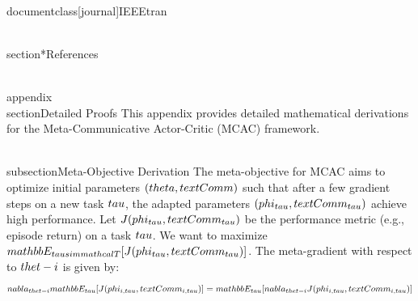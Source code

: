 \\documentclass[journal]{IEEEtran}
\begin{document}
\\section*{References}
\
\

\\appendix
\\section{Detailed Proofs}
This appendix provides detailed mathematical derivations for the Meta-Communicative Actor-Critic (MCAC) framework.

\\subsection{Meta-Objective Derivation}
The meta-objective for MCAC aims to optimize initial parameters $(\\theta, \\text{Comm})$ such that after a few gradient steps on a new task $\\tau$, the adapted parameters $(\\phi_{\\tau}, \\text{Comm}_{\\tau})$ achieve high performance.
Let $J(\\phi_{\\tau}, \\text{Comm}_{\\tau})$ be the performance metric (e.g., episode return) on a task $\\tau$. We want to maximize $\\mathbb{E}_{\\tau \\sim \\mathcal{T}}[J(\\phi_{\\tau}, \\text{Comm}_{\\tau})]$.
The meta-gradient with respect to $\\thet-i$ is given by:
$$ \\nabla_{\\thet-i} \\mathbb{E}_{\\tau}[J(\\phi_{i,\\tau}, \\text{Comm}_{i,\\tau})] = \\mathbb{E}_{\\tau}[\\nabla_{\\thet-i} J(\\phi_{i,\\tau}, \\text{Comm}_{i,\\tau})] $$
\end{document}
